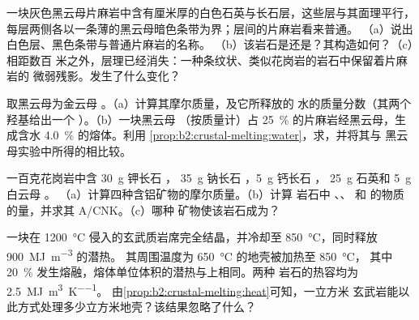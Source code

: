 \begin{exercise}[$\star$]\label{exo:b2:crustal-melting:4}
一块灰色黑云母片麻岩中含有厘米厚的白色石英与长石层，这些层与其面理平行，
每层两侧各以一条薄的黑云母暗色条带为界；层间的片麻岩看来普通。
（a）说出白色层、黑色条带与普通片麻岩的名称。
（b）该岩石是还是？其构造如何？（c）相距数百
米之外，层理已经消失：一种条纹状、类似花岗岩的岩石中保留着片麻岩的
微弱残影。发生了什么变化？
\end{exercise}

\begin{exercise}[$\star\star$]\label{exo:b2:crustal-melting:5}
取黑云母为金云母 。（a）计算其摩尔质量，及它所释放的
水的质量分数（其两个羟基给出一个 ）。（b）一块黑云母
（按质量计）占 \qty{25}{\percent} 的片麻岩经黑云母，生成含水
\qty{4.0}{\percent} 的熔体。利用
\cref{prop:b2:crustal-melting:water}，求，并将其与
黑云母实验中所得的相比较。
\end{exercise}

\begin{exercise}[$\star\star$]\label{exo:b2:crustal-melting:6}
一百克花岗岩中含 \qty{30}{\gram} 钾长石 ，
\qty{35}{\gram} 钠长石 ，\qty{5}{\gram} 钙长石 ，
\qty{25}{\gram} 石英和 \qty{5}{\gram} 白云母 。
（a）计算四种含铝矿物的摩尔质量。（b）计算
岩石中 、、 和  的物质的量，并求其 A/CNK。（c）哪种
矿物使该岩石成为？
\end{exercise}

\begin{exercise}[$\star\star$]\label{exo:b2:crustal-melting:7}
一块在 \qty{1200}{\celsius} 侵入的玄武质岩席完全结晶，并冷却至
\qty{850}{\celsius}，同时释放 \qty{900}{\mega\joule\per\cubic\metre} 的潜热。
其周围温度为 \qty{650}{\celsius} 的地壳被加热至 \qty{850}{\celsius}，
其中 \qty{20}{\percent} 发生熔融，熔体单位体积的潜热与上相同。两种
岩石的热容均为 \qty{2.5}{\mega\joule\per\cubic\metre\per\kelvin}。
由\cref{prop:b2:crustal-melting:heat}可知，一立方米
玄武岩能以此方式处理多少立方米地壳？该结果忽略了什么？
\end{exercise}

